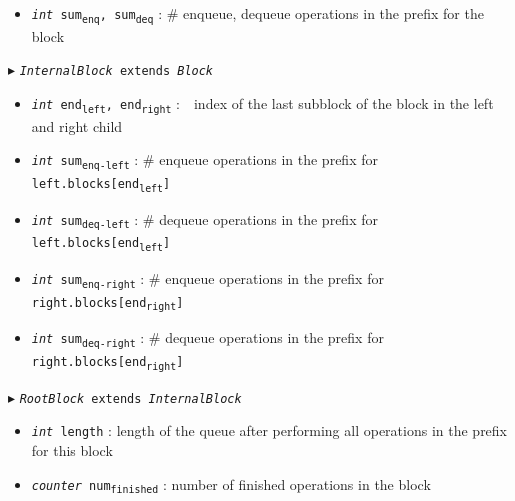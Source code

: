 \documentclass[10pt]{article}
\newcommand{\sub}[1]{\textsubscript{#1}}
\renewcommand{\tt}[1]{\texttt{#1}}
\renewcommand{\sl}[1]{\textsl{#1}}
\theoremstyle{definition}
\begin{document}
\begin{algorithm}
\begin{algorithmic}[1]
\begin{multicols}{2}
\begin{itemize}
    \item \tt{\sl{int} sum\sub{enq}, sum\sub{deq}}
  \textsf{: \# enqueue, dequeue operations in the prefix for the block}
  
\end{itemize}

\Statex $\blacktriangleright$ \tt{\sl{InternalBlock} extends \sl{Block}}
\begin{itemize}
    \item \tt{\sl{int} end\sub{left}, end\sub{right}}
  \textsf{:~~index of the last subblock of the block in the left and right child}
  \item \tt{\sl{int} sum\sub{enq-left}}
  \textsf{: \# enqueue operations in the prefix for \tt{left.blocks[end\sub{left}]}}
  \item \tt{\sl{int} sum\sub{deq-left}}
  \textsf{: \# dequeue operations in the prefix for \tt{left.blocks[end\sub{left}]}}
  \item \tt{\sl{int} sum\sub{enq-right}}
  \textsf{: \# enqueue operations in the prefix for \tt{right.blocks[end\sub{right}]}}
  \item \tt{\sl{int} sum\sub{deq-right}}
  \textsf{: \# dequeue operations in the prefix for \tt{right.blocks[end\sub{right}]}}
\end{itemize}


\Statex $\blacktriangleright$ \tt{\sl{RootBlock} extends \sl{InternalBlock}}
\begin{itemize}
  \item \tt{\sl{int} length}
  \textsf{: length of the queue after performing all operations in the prefix for this block}
  \item \tt{\sl{counter} num\sub{finished}}
  \textsf{: number of finished operations in the block}
\end{itemize}



\end{multicols}
\end{algorithmic}
\end{algorithm}
\end{document}
